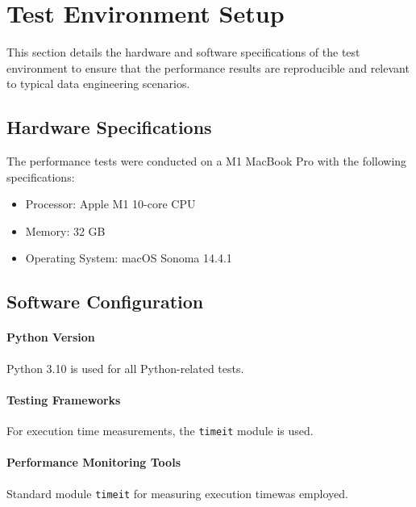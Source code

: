 \section{Test Environment Setup}


This section details the hardware and software specifications of the test environment to ensure that the performance results are reproducible and relevant to typical data engineering scenarios.

\subsection{Hardware Specifications}

    The performance tests were conducted on a M1 MacBook Pro with the following specifications:

    \begin{itemize}
        \item Processor: Apple M1 10-core CPU
        \item Memory: 32 GB
        \item Operating System: macOS Sonoma 14.4.1
    \end{itemize}

    \subsection{Software Configuration}

    \paragraph{Python Version} Python 3.10 is used for all Python-related tests.
    
    \paragraph{Testing Frameworks} For execution time measurements, the \texttt{timeit} module is used.
    \paragraph{Performance Monitoring Tools} Standard module \texttt{timeit} for measuring execution timewas employed.
